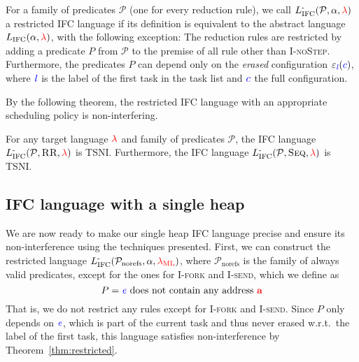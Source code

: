 \documentclass{sigplanconf}
\newcommand{\Varid}[1]{\mathit{#1}}
\newcommand{\Red}[1]{{\color{red} #1}}
\begin{document}
\begin{definition}
  \label{def:restricted}
  For a family of predicates $\mathcal P$ (one for every reduction
  rule), we call
  \ensuremath{L_\text{IFC}^{\text{-}}(\mathcal{P},\alpha,\Red{\lambda})} a restricted IFC language
  if its definition is equivalent to the abstract language
  \ensuremath{L_\text{IFC}(\alpha,\Red{\lambda})}, with the following exception:
  The reduction rules are restricted
  by adding a predicate $P$ from $\mathcal P$ to the premise of
  all rule other than \textsc{I-noStep}.  Furthermore, the predicates $P$
  can depend only on the \textit{erased} configuration
  \ensuremath{\varepsilon_{\ifc{\Varid{l}}}(\ifc{c})}, where \ensuremath{\ifc{\Varid{l}}} is the label of the first task
  in the task list and \ensuremath{\ifc{c}} the full configuration.
\end{definition}

By the following theorem, the restricted IFC language with an
appropriate scheduling policy is non-interfering.

\begin{theorem}
  \label{thm:restricted}
  For any target language \ensuremath{\Red{\lambda}} and family of predicates
  $\mathcal{P}$, the IFC language \ensuremath{L_\text{IFC}^{\text{-}}(\mathcal{P},\textsc{RR},\Red{\lambda})}
  is TSNI.  Furthermore, the IFC language
  \ensuremath{L_\text{IFC}^{\text{-}}(\mathcal{P},\textsc{Seq},\Red{\lambda})} is TSNI.
\end{theorem}


\subsection{IFC language with a single heap}

We are now ready to make our single heap IFC language precise and
ensure its non-interference using the techniques presented.
First, we can construct the restricted language
\ensuremath{L_\text{IFC}^{\text{-}}(\mathcal{P}_\text{norefs},\alpha,\Red{\lambda_{\text{ML}}})}, where \ensuremath{\mathcal{P}_\text{norefs}} is
the family of always valid predicates, except for the ones for
\textsc{I-fork} and \textsc{I-send}, which we define as
\[ P = \text{\ensuremath{\ifc{\Varid{e}}} does not contain any address \ensuremath{\tar{a}}} \]
That is, we do not restrict any rules except for \textsc{I-fork}
and \textsc{I-send}.
Since $P$ only depends on \ensuremath{\ifc{\Varid{e}}}, which is part of the current
task and thus never erased w.r.t.\ the label of the first task,
this language satisfies non-interference by Theorem~\ref{thm:restricted}.
\end{document}
